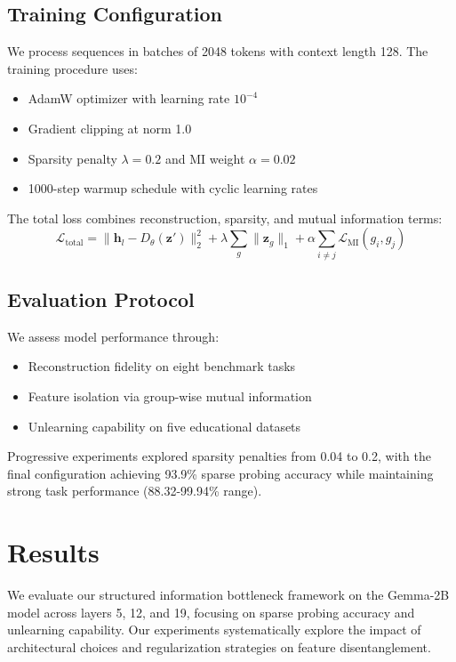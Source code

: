 \documentclass{article} %
\begin{document}
\subsection{Training Configuration}
We process sequences in batches of 2048 tokens with context length 128. The training procedure uses:

\begin{itemize}
    \item AdamW optimizer \cite{loshchilov2017adamw} with learning rate $10^{-4}$
    \item Gradient clipping at norm 1.0
    \item Sparsity penalty $\lambda=0.2$ and MI weight $\alpha=0.02$
    \item 1000-step warmup schedule with cyclic learning rates
\end{itemize}

The total loss combines reconstruction, sparsity, and mutual information terms:
\begin{equation}
\mathcal{L}_{\text{total}} = \|\mathbf{h}_l - D_{\theta}(\mathbf{z}')\|_2^2 + \lambda \sum_g \|\mathbf{z}_g\|_1 + \alpha \sum_{i \neq j} \mathcal{L}_{\text{MI}}(g_i, g_j)
\end{equation}

\subsection{Evaluation Protocol}
We assess model performance through:
\begin{itemize}
    \item Reconstruction fidelity on eight benchmark tasks
    \item Feature isolation via group-wise mutual information
    \item Unlearning capability on five educational datasets
\end{itemize}

Progressive experiments explored sparsity penalties from 0.04 to 0.2, with the final configuration achieving 93.9\% sparse probing accuracy while maintaining strong task performance (88.32-99.94\% range).

\section{Results}
\label{sec:results}

We evaluate our structured information bottleneck framework on the Gemma-2B model across layers 5, 12, and 19, focusing on sparse probing accuracy and unlearning capability. Our experiments systematically explore the impact of architectural choices and regularization strategies on feature disentanglement.
\end{document}
